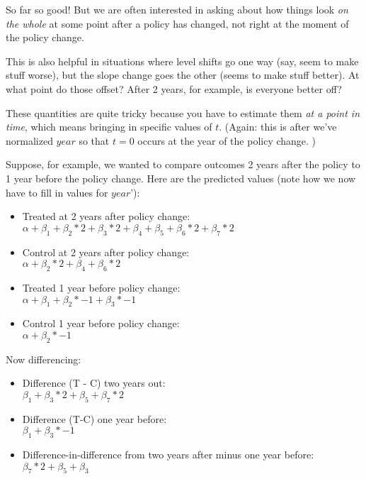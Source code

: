 \documentclass[12pt]{article}
\begin{document}
So far so good! But we are often interested in asking about how things look \emph{on the whole} at some point after a policy has changed, not right at the moment of the policy change.

This is also helpful in situations where level shifts go one way (say, seem to make stuff worse), but the slope change goes the other (seems to make stuff better). At what point do those offset? After 2 years, for example, is everyone better off?

These quantities are quite tricky because you have to estimate them \emph{at a point in time}, which means bringing in specific values of $t$. (Again: this is after we've normalized $year$ so that $t=0$ occurs at the year of the policy change. )

Suppose, for example, we wanted to compare outcomes 2 years after the policy to 1 year before the policy change. Here are the predicted values (note how we now have to fill in values for $year$'):

\begin{itemize}
  \item Treated at 2 years after policy change: \\
  $\alpha + \beta_1 + \beta_2 * 2 + \beta_3 * 2 + \beta_4 + \beta_5 + \beta_6 * 2 + \beta_7 * 2$
  \item Control at 2 years after policy change: \\
  $\alpha + \beta_2 * 2 + \beta_4 + \beta_6 * 2$
  \item Treated 1 year before policy change: \\
  $\alpha + \beta_1 + \beta_2 * -1 + \beta_3 * -1$
  \item Control 1 year before policy change: \\
  $\alpha + \beta_2 * -1$
\end{itemize}

Now differencing:

\begin{itemize}
  \item Difference (T - C) two years out: \\
  $\beta_1  + \beta_3 * 2+ \beta_5 + \beta_7 * 2$
  \item Difference (T-C) one year before: \\
  $\beta_1  + \beta_3 * -1$
  \item Difference-in-difference from two years after minus one year before: \\
  $\beta_7 * 2 + \beta_5 + \beta_3$
\end{itemize}
\end{document}
